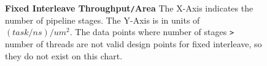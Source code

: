 \begin{figure}
\centering
{}
\caption{{\bf Fixed Interleave Throughput{\tt /}Area} The X-Axis indicates the number of pipeline stages. The Y-Axis is in units of $(task/ns)/um^2$. The data points where number of stages {\tt >} number of threads are not valid design points for fixed interleave, so they do not exist on this chart.}
\label{fig:fixedThroughputPerArea}
\end{figure}
